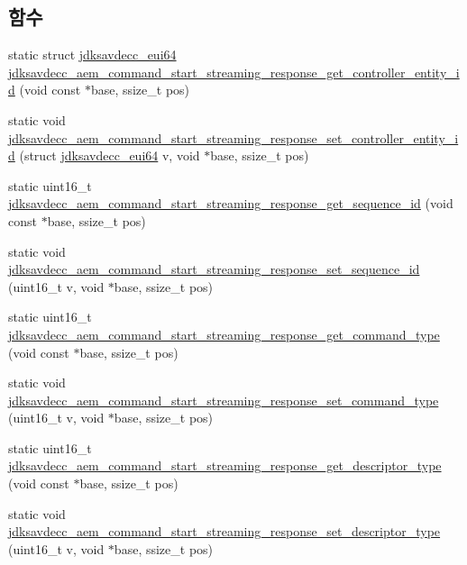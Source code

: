 \subsection*{함수}
\begin{DoxyCompactItemize}
\item 
static struct \hyperlink{structjdksavdecc__eui64}{jdksavdecc\+\_\+eui64} \hyperlink{group__command__start__streaming__response_ga30577b0b98a7a01bcaef2664db268bf7}{jdksavdecc\+\_\+aem\+\_\+command\+\_\+start\+\_\+streaming\+\_\+response\+\_\+get\+\_\+controller\+\_\+entity\+\_\+id} (void const $\ast$base, ssize\+\_\+t pos)
\item 
static void \hyperlink{group__command__start__streaming__response_gaf67c27122a5f2a4053d783e0564bc382}{jdksavdecc\+\_\+aem\+\_\+command\+\_\+start\+\_\+streaming\+\_\+response\+\_\+set\+\_\+controller\+\_\+entity\+\_\+id} (struct \hyperlink{structjdksavdecc__eui64}{jdksavdecc\+\_\+eui64} v, void $\ast$base, ssize\+\_\+t pos)
\item 
static uint16\+\_\+t \hyperlink{group__command__start__streaming__response_ga0537b69aa62c295a4966748f2e37f9f0}{jdksavdecc\+\_\+aem\+\_\+command\+\_\+start\+\_\+streaming\+\_\+response\+\_\+get\+\_\+sequence\+\_\+id} (void const $\ast$base, ssize\+\_\+t pos)
\item 
static void \hyperlink{group__command__start__streaming__response_gac1d5459a506d4acad8b15ca697540230}{jdksavdecc\+\_\+aem\+\_\+command\+\_\+start\+\_\+streaming\+\_\+response\+\_\+set\+\_\+sequence\+\_\+id} (uint16\+\_\+t v, void $\ast$base, ssize\+\_\+t pos)
\item 
static uint16\+\_\+t \hyperlink{group__command__start__streaming__response_gad40cd2ed2fbe878e92c245bb86cea10a}{jdksavdecc\+\_\+aem\+\_\+command\+\_\+start\+\_\+streaming\+\_\+response\+\_\+get\+\_\+command\+\_\+type} (void const $\ast$base, ssize\+\_\+t pos)
\item 
static void \hyperlink{group__command__start__streaming__response_ga86475402d596756d5f77e51d9680e3fe}{jdksavdecc\+\_\+aem\+\_\+command\+\_\+start\+\_\+streaming\+\_\+response\+\_\+set\+\_\+command\+\_\+type} (uint16\+\_\+t v, void $\ast$base, ssize\+\_\+t pos)
\item 
static uint16\+\_\+t \hyperlink{group__command__start__streaming__response_ga89f9710e58a269070610321fa9d67fc6}{jdksavdecc\+\_\+aem\+\_\+command\+\_\+start\+\_\+streaming\+\_\+response\+\_\+get\+\_\+descriptor\+\_\+type} (void const $\ast$base, ssize\+\_\+t pos)
\item 
static void \hyperlink{group__command__start__streaming__response_ga83a272eb004777ce4367266325c43694}{jdksavdecc\+\_\+aem\+\_\+command\+\_\+start\+\_\+streaming\+\_\+response\+\_\+set\+\_\+descriptor\+\_\+type} (uint16\+\_\+t v, void $\ast$base, ssize\+\_\+t pos)

\end{DoxyCompactItemize}
